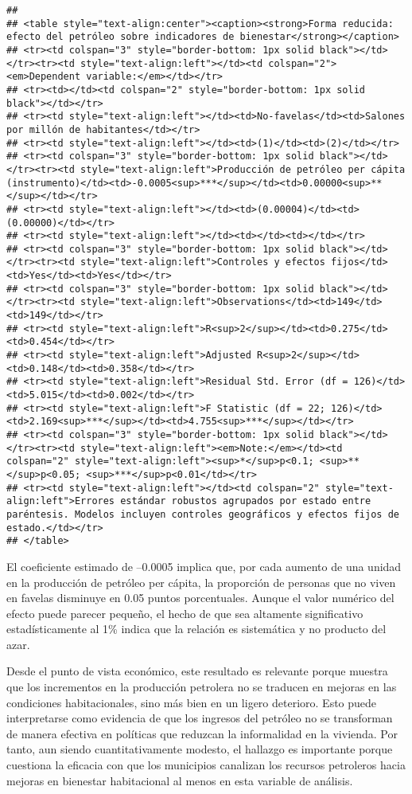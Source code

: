 \documentclass[
]{article}
\begin{document}
\begin{verbatim}
## 
## <table style="text-align:center"><caption><strong>Forma reducida: efecto del petróleo sobre indicadores de bienestar</strong></caption>
## <tr><td colspan="3" style="border-bottom: 1px solid black"></td></tr><tr><td style="text-align:left"></td><td colspan="2"><em>Dependent variable:</em></td></tr>
## <tr><td></td><td colspan="2" style="border-bottom: 1px solid black"></td></tr>
## <tr><td style="text-align:left"></td><td>No-favelas</td><td>Salones por millón de habitantes</td></tr>
## <tr><td style="text-align:left"></td><td>(1)</td><td>(2)</td></tr>
## <tr><td colspan="3" style="border-bottom: 1px solid black"></td></tr><tr><td style="text-align:left">Producción de petróleo per cápita (instrumento)</td><td>-0.0005<sup>***</sup></td><td>0.00000<sup>**</sup></td></tr>
## <tr><td style="text-align:left"></td><td>(0.00004)</td><td>(0.00000)</td></tr>
## <tr><td style="text-align:left"></td><td></td><td></td></tr>
## <tr><td colspan="3" style="border-bottom: 1px solid black"></td></tr><tr><td style="text-align:left">Controles y efectos fijos</td><td>Yes</td><td>Yes</td></tr>
## <tr><td colspan="3" style="border-bottom: 1px solid black"></td></tr><tr><td style="text-align:left">Observations</td><td>149</td><td>149</td></tr>
## <tr><td style="text-align:left">R<sup>2</sup></td><td>0.275</td><td>0.454</td></tr>
## <tr><td style="text-align:left">Adjusted R<sup>2</sup></td><td>0.148</td><td>0.358</td></tr>
## <tr><td style="text-align:left">Residual Std. Error (df = 126)</td><td>5.015</td><td>0.002</td></tr>
## <tr><td style="text-align:left">F Statistic (df = 22; 126)</td><td>2.169<sup>***</sup></td><td>4.755<sup>***</sup></td></tr>
## <tr><td colspan="3" style="border-bottom: 1px solid black"></td></tr><tr><td style="text-align:left"><em>Note:</em></td><td colspan="2" style="text-align:left"><sup>*</sup>p<0.1; <sup>**</sup>p<0.05; <sup>***</sup>p<0.01</td></tr>
## <tr><td style="text-align:left"></td><td colspan="2" style="text-align:left">Errores estándar robustos agrupados por estado entre paréntesis. Modelos incluyen controles geográficos y efectos fijos de estado.</td></tr>
## </table>
\end{verbatim}

El coeficiente estimado de --0.0005 implica que, por cada aumento de una
unidad en la producción de petróleo per cápita, la proporción de
personas que no viven en favelas disminuye en 0.05 puntos porcentuales.
Aunque el valor numérico del efecto puede parecer pequeño, el hecho de
que sea altamente significativo estadísticamente al 1\% indica que la
relación es sistemática y no producto del azar.

Desde el punto de vista económico, este resultado es relevante porque
muestra que los incrementos en la producción petrolera no se traducen en
mejoras en las condiciones habitacionales, sino más bien en un ligero
deterioro. Esto puede interpretarse como evidencia de que los ingresos
del petróleo no se transforman de manera efectiva en políticas que
reduzcan la informalidad en la vivienda. Por tanto, aun siendo
cuantitativamente modesto, el hallazgo es importante porque cuestiona la
eficacia con que los municipios canalizan los recursos petroleros hacia
mejoras en bienestar habitacional al menos en esta variable de análisis.
\end{document}
